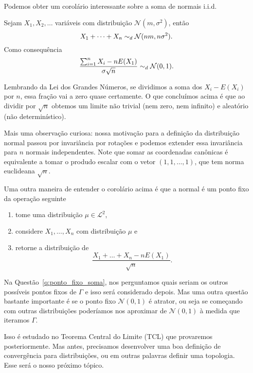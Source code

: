 Podemos obter um corolário interessante sobre a soma de normais i.i.d.
\begin{corollary}
  \label{c:normaliz_normais}
  Sejam $X_1, X_2, \dots$ variáveis \iid com distribuição $\mathcal{N}(m,\sigma^2)$, então
  \begin{equation}
    X_1 + \dots + X_n \sim_d \mathcal{N}(nm, n \sigma^2).
  \end{equation}
  Como consequência
  \begin{equation}
    \frac{\sum_{i=1}^n X_i - n E(X_1)}{\sigma \sqrt{n}} \sim_d \mathcal{N}(0,1).
  \end{equation}
\end{corollary}

Lembrando da Lei dos Grandes Números, se dividimos a soma dos $X_i - E(X_i)$ por $n$, essa fração vai a zero quase certamente.
O que concluímos acima é que ao dividir por $\sqrt{n}$ obtemos um limite não trivial (nem zero, nem infinito) e aleatório (não determinístico).

Mais uma observação curiosa: nossa motivação para a definição da distribuição normal passou por invariância por rotações e podemos extender essa invariância para $n$ normais independentes.
Note que somar as coordenadas canônicas é equivalente a tomar o produdo escalar com o vetor $(1,1,\dots,1)$, que tem norma euclideana $\sqrt{n}$.

Uma outra maneira de entender o corolário acima é que a normal é um ponto fixo da operação seguinte
\begin{enumerate}[\quad a)]
\item tome uma distribuição $\mu \in \mathcal{L}^2$,
\item considere $X_1, \dots, X_n$ \iid com distribuição $\mu$ e
\item retorne a distribuição de
  \begin{equation}
    \frac{X_1 + \dots + X_n - n E(X_1)}{\sqrt{n}}.
  \end{equation}
\end{enumerate}

Na Questão~\ref{q:ponto_fixo_soma}, nos perguntamos quais seriam os outros possíveis pontos fixos de $\Gamma$ e isso será considerado depois.
Mas uma outra questão bastante importante é se o ponto fixo $\mathcal{N}(0,1)$ é atrator, ou seja se começando com outras distribuições poderíamos nos aproximar de $\mathcal{N}(0,1)$ à medida que iteramos $\Gamma$.

Isso é estudado no Teorema Central do Limite (TCL) que provaremos posteriormente.
Mas antes, precisamos desenvolver uma boa definição de convergência para distribuições, ou em outras palavras definir uma topologia.
Esse será o nosso próximo tópico.

